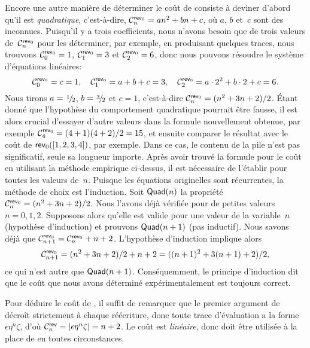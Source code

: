 Encore une autre manière de déterminer le coût de 
consiste à deviner d'abord qu'il est
\emph{quadratique}, c'est-à-dire,
\(\C{\fun{rev}_0}{n} = an^2 + bn +
c\), où \(a\), \(b\) et~\(c\) sont
des inconnues. Puisqu'il y a trois coefficients, nous n'avons besoin
que de trois valeurs de~\(\C{\fun{rev}_0}{n}\) pour les déterminer,
par exemple, en produisant quelques traces, nous trouvons
\(\C{\fun{rev}_0}{0} = 1\), \(\C{\fun{rev}_0}{1} = 3\) et
\(\C{\fun{rev}_0}{2} = 6\), donc nous pouvons résoudre le système
d'équations linéaires:
\begin{equation*}
\C{\fun{rev}_0}{0} = c = 1,\quad
\C{\fun{rev}_0}{1} = a + b + c = 3,\quad
\C{\fun{rev}_0}{2} = a \cdot 2^2 + b \cdot 2 + c = 6.
\end{equation*}
Nous tirons \(a = \myfrac1/2\), \(b = \myfrac3/2\) et \(c = 1\),
c'est-à-dire \(\C{\fun{rev}_0}{n} = (n^2 + 3n +
2)/2\). Étant donné que l'hypothèse
du comportement quadratique pourrait être fausse, il est alors crucial
d'essayer d'autre valeurs dans la formule nouvellement obtenue, par
exemple \(\C{\fun{rev}_0}{4} = (4+1)(4+2)/2 = 15\), et ensuite
comparer le résultat avec le coût de
\(\fun{rev}_0([1,2,3,4])\), par
exemple.  Dans ce cas, le contenu de la pile n'est pas significatif,
seule sa longueur importe. Après avoir trouvé la formule pour le coût
en utilisant la méthode empirique ci-dessus, il est nécessaire de
l'établir pour toutes les valeurs de~\(n\). Puisque les équations
originelles sont récurrentes, la méthode de choix est l'induction. Soit
\(\pred{Quad}{n}\) la propriété
\(\C{\fun{rev}_0}{n} = (n^2 + 3n + 2)/2\). Nous l'avons déjà vérifiée
pour de petites valeurs \(n = 0, 1, 2\). Supposons alors qu'elle est
valide pour une valeur de la variable~\(n\) (hypothèse d'induction) et
prouvons \(\pred{Quad}{n+1}\) (pas inductif). Nous savons déjà que
\(\C{\fun{rev}_0}{n+1} = \C{\fun{rev}_0}{n} + n +
2\). L'hypothèse d'induction implique
alors
\begin{equation*}
\C{\fun{rev}_0}{n+1} = (n^2 + 3n + 2)/2 + n + 2
                     = ((n+1)^2 + 3(n+1) + 2)/2,
\end{equation*}
ce qui n'est autre que \(\pred{Quad}{n+1}\). 
Conséquemment, le principe d'induction dit que le coût que nous avons déterminé expérimentalement est toujours correct.

Pour déduire le coût de , il suffit
de remarquer que le premier argument de
 décroît strictement à chaque
réécriture, donc toute trace d'évaluation a la forme
\(\epsilon\eta^n\zeta\), d'où \(\C{\fun{rev}}{n} =
\len{\epsilon\eta^n\zeta } = n + 2\). Le coût est
\emph{linéaire}, donc
 doit être utilisée à la place de
 en toutes
circonstances.

